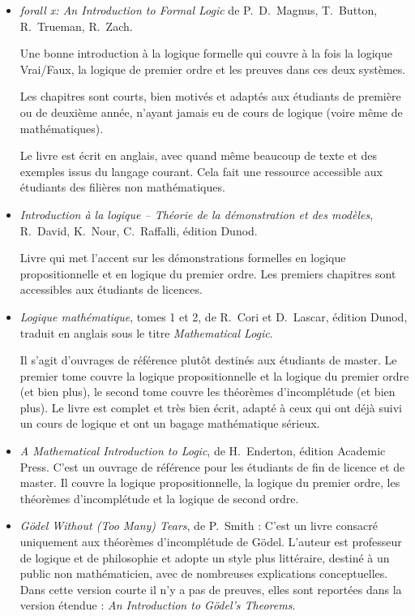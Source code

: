 \documentclass[11pt,class=report,crop=false]{standalone}
\begin{document}
\begin{itemize}
    \item \emph{forall x: An Introduction to Formal Logic} de P.~D.~Magnus, T.~Button, R.~Trueman, R.~Zach.

    Une bonne introduction à la logique formelle qui couvre à la fois la logique Vrai/Faux, la logique de premier ordre et les preuves dans ces deux systèmes.

    Les chapitres sont courts, bien motivés et adaptés aux étudiants de première ou de deuxième année, n'ayant jamais eu de cours de logique (voire même de mathématiques). 
    
    Le livre est écrit en anglais, avec quand même beaucoup de texte et des exemples issus du langage courant. Cela fait une ressource accessible aux étudiants des filières non mathématiques.

    \item \emph{Introduction à la logique -- Théorie de la démonstration et des modèles}, R.~David, K.~Nour, C.~Raffalli, édition Dunod. 
    
    Livre qui met l'accent sur les démonstrations formelles en logique propositionnelle et en logique du premier ordre. Les premiers chapitres sont accessibles aux étudiants de licences.

    \item \emph{Logique mathématique}, tomes 1 et 2, de R.~Cori et D.~Lascar, édition Dunod, traduit en anglais sous le titre \emph{Mathematical Logic}.

    Il s'agit d'ouvrages de référence plutôt destinés aux étudiants de master. Le premier tome couvre la logique propositionnelle et la logique du premier ordre (et bien plus), le second tome couvre les théorèmes d'incomplétude (et bien plus).
    Le livre est complet et très bien écrit, adapté à ceux qui ont déjà suivi un cours de logique et ont un bagage mathématique sérieux.

    \item \emph{A Mathematical Introduction to Logic}, de H.~Enderton, édition Academic Press.
    C'est un ouvrage de référence pour les étudiants de fin de licence et de master. Il couvre la logique propositionnelle, la logique du premier ordre, les théorèmes d'incomplétude et la logique de second ordre.

    \item \emph{Gödel Without (Too Many) Tears}, de P.~Smith :
    C'est un livre consacré uniquement aux théorèmes d'incomplétude de Gödel.
    L'auteur est professeur de logique et de philosophie et adopte un style plus littéraire, destiné à un public non mathématicien, avec de nombreuses explications conceptuelles. Dans cette version courte il n'y a pas de preuves, elles sont reportées dans la version étendue : \emph{An Introduction to Gödel's Theorems}.


\end{itemize}
\end{document}
